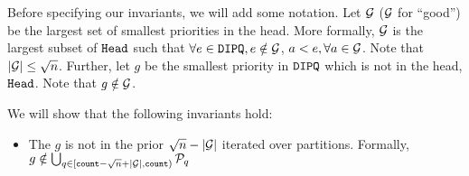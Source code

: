 Before specifying our invariants, we will add some notation. Let $\mathcal{G}$ ($\mathcal{G}$ for ``good'') be the largest set of smallest priorities in the head. More formally,
$\mathcal{G}$ is the largest subset of $\texttt{Head}$ such that $\forall e \in \texttt{DIPQ}, e \notin \mathcal{G}$, $a < e, \forall a \in \mathcal{G}$. Note that $|\mathcal{G}| \leq {\sqrt{n}}$.
Further, let $g$ be the smallest priority in $\texttt{DIPQ}$ which is not in the head, $\texttt{Head}$.
Note that $g \notin \mathcal{G}$.

We will show that the following invariants hold:
\begin{itemize}
	\item The $g$ is not in the prior ${\sqrt{n}} - |\mathcal{G}|$ iterated over partitions. Formally, $g \notin \bigcup_{q \in [{\texttt{count}} - {\sqrt{n}} + |\mathcal{G}|, {\texttt{count}})} \mathcal{P}_q$
\end{itemize}


